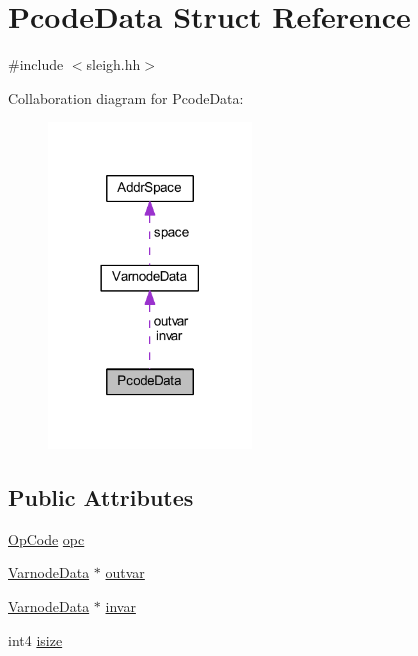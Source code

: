 \hypertarget{struct_pcode_data}{}\section{Pcode\+Data Struct Reference}
\label{struct_pcode_data}


{\ttfamily \#include $<$sleigh.\+hh$>$}



Collaboration diagram for Pcode\+Data\+:
\nopagebreak
\begin{figure}[H]
\begin{center}
\leavevmode
\includegraphics[width=153pt]{struct_pcode_data__coll__graph}
\end{center}
\end{figure}
\subsection*{Public Attributes}
\begin{DoxyCompactItemize}
\item 
\mbox{\hyperlink{opcodes_8hh_abeb7dfb0e9e2b3114e240a405d046ea7}{Op\+Code}} \mbox{\hyperlink{struct_pcode_data_a79e291dfd074383adc36230588ed193c}{opc}}
\item 
\mbox{\hyperlink{struct_varnode_data}{Varnode\+Data}} $\ast$ \mbox{\hyperlink{struct_pcode_data_a59a94589691bb191caf9efdc7e1d7b1d}{outvar}}
\item 
\mbox{\hyperlink{struct_varnode_data}{Varnode\+Data}} $\ast$ \mbox{\hyperlink{struct_pcode_data_ab0572b3620e623607f76ad6b580dc589}{invar}}
\item 
int4 \mbox{\hyperlink{struct_pcode_data_a32d8b960a624c445680fb478f203a18e}{isize}}
\end{DoxyCompactItemize}


